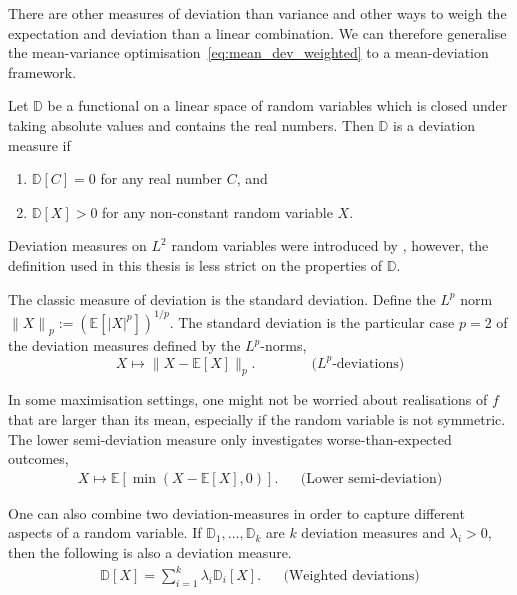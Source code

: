 \documentclass[main.tex]{subfiles}
\begin{document}
There are other measures of deviation than variance and other ways to
weigh the expectation and deviation than a linear combination. We can
therefore generalise the mean-variance
optimisation~\eqref{eq:mean_dev_weighted} to a mean-deviation framework.

\begin{mydef}
  Let $\mathbb{D}$ be a functional on a linear space of random
  variables which is closed under taking absolute values and contains
  the real numbers.
  Then $\mathbb{D}$ is a deviation measure if
  \begin{enumerate}
  \item $\mathbb{D}[C] = 0$ for any real number $C$, and
  \item $\mathbb{D}[X]>0$ for any non-constant random variable $X$.
  \end{enumerate}
\end{mydef}
Deviation measures on $L^2$ random variables were introduced by
\citet{rockafellar2006generalized}, however, the definition used in this thesis
is less strict on the properties of $\mathbb{D}$.

\begin{example}
  The classic measure of deviation is the standard deviation.
  Define the $L^p$ norm ${\|X\|}_p := {\left( \mathbb{E}[{|X|}^p]
    \right)}^{1/p}$.
  The standard deviation is
  the particular case $p=2$ of the deviation measures defined by
  the $L^p$-norms,
  \begin{equation}
    X\mapsto
    \|X-\mathbb{E}[X]\|_p.
    \qquad\qquad \text{($L^p$-deviations)}
  \end{equation}

  In some maximisation settings, one might not be worried about
  realisations of $f$ that are larger than its mean, especially if the
  random variable is not symmetric.
  The lower semi-deviation measure only investigates
  worse-than-expected outcomes,
  \begin{align}
    X\mapsto \mathbb{E}[\min(X-\mathbb{E}[X],0)].
    &&\text{(Lower semi-deviation)}
  \end{align}

  One can also combine two deviation-measures in order to capture
  different aspects of a random variable.
  If $\mathbb{D}_1,\dots,\mathbb{D}_k$ are $k$ deviation measures and
  $\lambda_i>0$, then the following
  is also a deviation measure.
  \begin{align}
    \mathbb{D}[X]=\sum_{i=1}^k\lambda_i\mathbb{D}_i[X].
    &&\text{(Weighted deviations)}
  \end{align}
\end{example}
\end{document}
